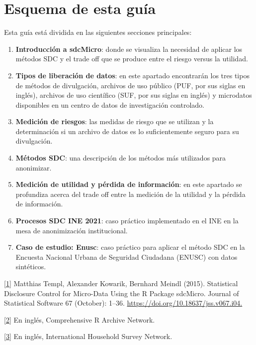 \documentclass[
]{book}
\theoremstyle{definition}
\theoremstyle{definition}
\theoremstyle{definition}
\theoremstyle{definition}
\theoremstyle{remark}
\begin{document}
\hypertarget{esquema-de-esta-guuxeda}{%
\section{Esquema de esta guía}\label{esquema-de-esta-guuxeda}}

Esta guía está dividida en las siguientes secciones principales:

\begin{enumerate}
\def\labelenumi{\arabic{enumi}.}
\item
  \textbf{Introducción a sdcMicro}: donde se visualiza la necesidad de aplicar los métodos SDC y el trade off que se produce entre el riesgo versus la utilidad.
\item
  \textbf{Tipos de liberación de datos}: en este apartado encontrarán los tres tipos de métodos de divulgación, archivos de uso público (PUF, por sus siglas en inglés), archivos de uso científico (SUF, por sus siglas en inglés) y microdatos disponibles en un centro de datos de investigación controlado.
\item
  \textbf{Medición de riesgos}: las medidas de riesgo que se utilizan y la determinación si un archivo de datos es lo suficientemente seguro para su divulgación.
\item
  \textbf{Métodos SDC}: una descripción de los métodos más utilizados para anonimizar.
\item
  \textbf{Medición de utilidad y pérdida de información}: en este apartado se profundiza acerca del trade off entre la medición de la utilidad y la pérdida de información.
\item
  \textbf{Procesos SDC INE 2021}: caso práctico implementado en el INE en la mesa de anonimización institucional.
\item
  \textbf{Caso de estudio: Enusc}: caso práctico para aplicar el método SDC en la Encuesta Nacional Urbana de Seguridad Ciudadana (ENUSC) con datos sintéticos.
\end{enumerate}

\protect\hyperlink{_ftnref1}{{[}1{]}} Matthias Templ, Alexander Kowarik, Bernhard Meindl (2015). Statistical Disclosure Control for Micro-Data Using the R Package sdcMicro. Journal of Statistical Software 67 (October): 1--36. \url{https://doi.org/10.18637/jss.v067.i04.}

\protect\hyperlink{_ftnref2}{{[}2{]}} En inglés, Comprehensive R Archive Network.

\protect\hyperlink{_ftnref3}{{[}3{]}} En inglés, International Household Survey Network.
\end{document}
